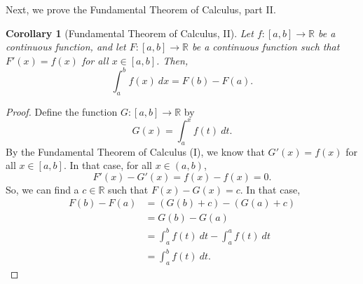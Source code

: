 \documentclass[a4paper, openany]{memoir}
\theoremstyle{definition}
\theoremstyle{plain}
\newtheorem{corollary}[definition]{Corollary}
\begin{document}
\noindent Next, we prove the Fundamental Theorem of Calculus, part II.
\begin{corollary}[Fundamental Theorem of Calculus, II]
Let $f: [a, b] \to \mathbb{R}$ be a continuous function, and let $F: [a, b] \to \mathbb{R}$ be a continuous function such that $F'(x) = f(x)$ for all $x \in [a, b]$. Then,
\[\int_a^b f(x) \ dx = F(b) - F(a).\]
\end{corollary}
\begin{proof}
Define the function $G: [a, b] \to \mathbb{R}$ by 
\[G(x) = \int_a^x f(t) \ dt.\]
By the Fundamental Theorem of Calculus (I), we know that $G'(x) = f(x)$ for all $x \in [a, b]$. In that case, for all $x \in (a, b)$,
\[F'(x) - G'(x) = f(x) - f(x) = 0.\]
So, we can find a $c \in \mathbb{R}$ such that $F(x) - G(x) = c$. In that case,
\begin{align*}
    F(b) - F(a) &= (G(b) + c) - (G(a) + c) \\
    &= G(b) - G(a) \\
    &= \int_a^b f(t) \ dt - \int_a^a f(t) \ dt \\
    &= \int_a^b f(t) \ dt.
\end{align*}
\end{proof}
\end{document}
